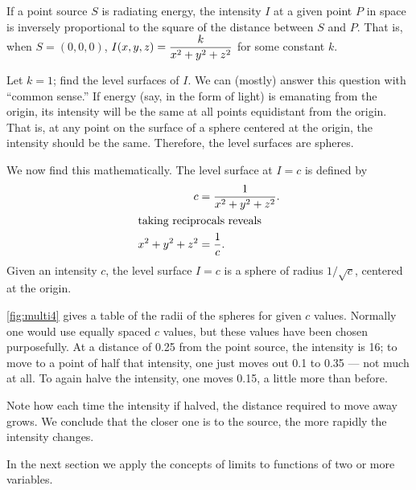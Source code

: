 \begin{example}\label{ex_multi4}%
If a point source $S$ is radiating energy, the intensity $I$ at a given point $P$ in space is inversely proportional to the square of the distance between $S$ and $P$. That is, when $S=(0,0,0)$,  $\displaystyle I(x,y,z) = \frac{k}{x^2+y^2+z^2}$ for some constant $k$.

Let $k=1$; find the level surfaces of $I$.
\solution
We can (mostly) answer this question with ``common sense.'' If energy (say, in the form of light) is emanating from the origin, its intensity will be the same at all points equidistant from the origin. That is, at any point on the surface of a sphere centered at the origin, the intensity should be the same. Therefore, the level surfaces are spheres.

We now find this mathematically. The level surface at $I=c$ is defined by 
\begin{align*}
c &= \frac{1}{x^2+y^2+z^2}.\\
\intertext{taking reciprocals reveals}
x^2+y^2+z^2 &= \frac1c.
\end{align*}
Given an intensity $c$, the level surface $I=c$ is a sphere of radius $1/\sqrt{c}$, centered at the origin. 


\autoref{fig:multi4} gives a table of the radii of the spheres for given $c$ values. Normally one would use equally spaced $c$ values, but these values have been chosen purposefully. At a distance of 0.25 from the point source, the intensity is 16; to move to a point of half that intensity, one just moves out 0.1 to 0.35 --- not much at all. To again halve the intensity, one moves 0.15, a little more than before.

Note how each time the intensity if halved, the distance required to move away grows. We conclude that the closer one is to the source, the more rapidly the intensity changes.
\end{example}

In the next section we apply the concepts of limits to functions of two or more variables.

